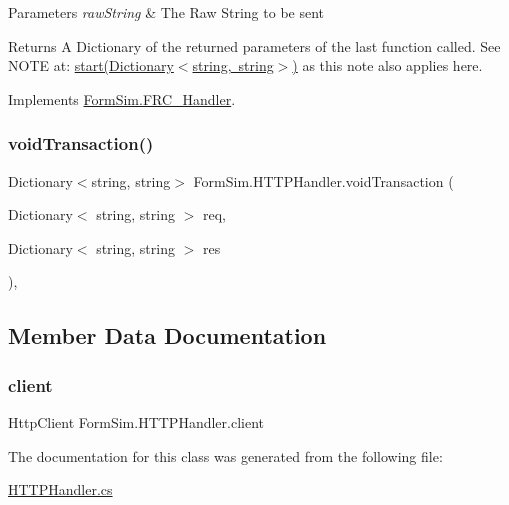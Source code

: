 \begin{DoxyParams}{Parameters}
{\em raw\+String} & The Raw String to be sent\\
\hline
\end{DoxyParams}
\begin{DoxyReturn}{Returns}
A Dictionary of the returned parameters of the last function called. See N\+O\+TE at\+: \mbox{\hyperlink{interface_form_sim_1_1_f_r_c___handler_a2a2a8a776e774e5f8b5e2b7e623a26a6}{start(\+Dictionary$<$string, string$>$)}} as this note also applies here.
\end{DoxyReturn}


Implements \mbox{\hyperlink{interface_form_sim_1_1_f_r_c___handler_a1f855ed4026632d00ac5fc6784c3bf0f}{Form\+Sim.\+F\+R\+C\+\_\+\+Handler}}.

\mbox{\label{class_form_sim_1_1_h_t_t_p_handler_a9b0d19f62c0e810686bfafe5b7c1635e}} 
\subsubsection{\texorpdfstring{void\+Transaction()}{voidTransaction()}}
{\footnotesize\ttfamily Dictionary$<$string, string$>$ Form\+Sim.\+H\+T\+T\+P\+Handler.\+void\+Transaction (\begin{DoxyParamCaption}\item[{Dictionary$<$ string, string $>$}]{req,  }\item[{Dictionary$<$ string, string $>$}]{res }\end{DoxyParamCaption})\hspace{0.3cm}{\ttfamily [inline]}, {\ttfamily [private]}}



\subsection{Member Data Documentation}
\mbox{\label{class_form_sim_1_1_h_t_t_p_handler_a1ce7f8f2407501a53c791cc6323ea5c7}} 
\subsubsection{\texorpdfstring{client}{client}}
{\footnotesize\ttfamily Http\+Client Form\+Sim.\+H\+T\+T\+P\+Handler.\+client\hspace{0.3cm}{\ttfamily [protected]}}



The documentation for this class was generated from the following file\+:\begin{DoxyCompactItemize}
\item 
\mbox{\hyperlink{_h_t_t_p_handler_8cs}{H\+T\+T\+P\+Handler.\+cs}}\end{DoxyCompactItemize}
